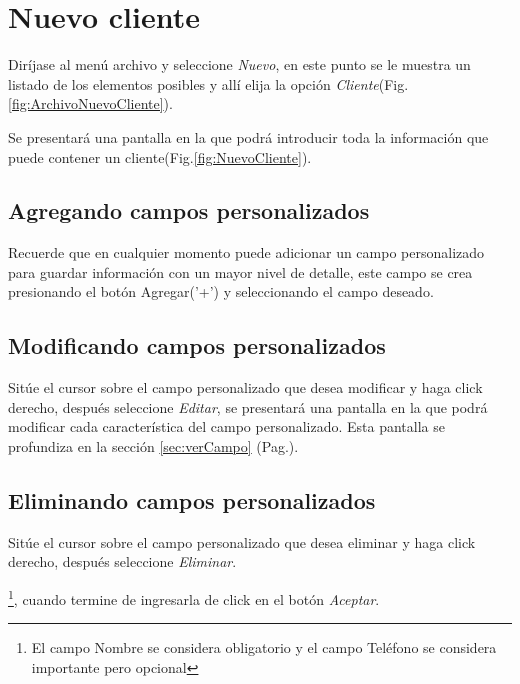 \section{Nuevo cliente}
\label{sec:nuevoCliente}
Dir\'ijase al men\'u archivo y seleccione \emph{Nuevo}, en este punto se le muestra un listado de los elementos posibles y
all\'i elija la opci\'on \emph{Cliente}(Fig.\ref{fig:ArchivoNuevoCliente}). 
  

Se presentar\'a una pantalla en la que podr\'a introducir toda la informaci\'on
que puede contener un cliente(Fig.\ref{fig:NuevoCliente}). 
  

\subsection{Agregando campos personalizados}
\label{sec:agregarCamposCliente}
Recuerde que en cualquier momento puede adicionar un campo personalizado para guardar informaci\'on con un mayor nivel de detalle, este campo se crea presionando el bot\'on Agregar('+') y seleccionando el campo deseado.

\subsection{Modificando campos personalizados}
\label{sec:modificarCamposCliente}
Sit\'ue el cursor sobre el campo personalizado que desea modificar y haga click derecho, despu\'es seleccione \emph{Editar},
se presentar\'a una pantalla en la que podr\'a modificar cada caracter\'istica
del campo personalizado. Esta pantalla se profundiza en la secci\'on
\ref{sec:verCampo} (Pag.\pageref{sec:verCampo}).

\subsection{Eliminando campos personalizados}
\label{sec:eliminarCamposCliente}
Sit\'ue el cursor sobre el campo personalizado que desea eliminar y haga click derecho, despu\'es seleccione \emph{Eliminar}.

\footnote{El campo Nombre se considera obligatorio y el campo Tel\'efono se
considera importante pero opcional},
cuando termine de ingresarla de click en el bot\'on \emph{Aceptar}.



